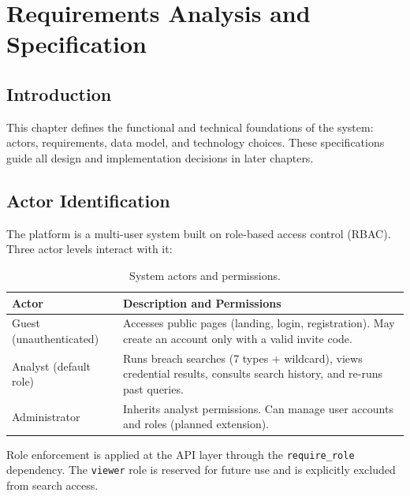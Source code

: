 \chapter{Requirements Analysis and Specification}
\label{chap:requirements}

\section*{Introduction}

This chapter defines the functional and technical foundations of the system:
actors, requirements, data model, and technology choices. These specifications
guide all design and implementation decisions in later chapters.

\section{Actor Identification}
\label{sec:actors}

The platform is a multi-user system built on role-based access control (RBAC).
Three actor levels interact with it:

\renewcommand{\arraystretch}{1.45}
\begin{table}[ht]
\centering
\caption{System actors and permissions.}
\label{tab:actors}
\begin{tabularx}{\textwidth}{@{} l X @{}}
\toprule
\textbf{Actor} & \textbf{Description and Permissions} \\
\midrule
Guest (unauthenticated) &
  Accesses public pages (landing, login, registration). May create an account
  only with a valid invite code. \\[8pt]
Analyst (default role) &
  Runs breach searches (7 types + wildcard), views credential results,
  consults search history, and re-runs past queries. \\[8pt]
Administrator &
  Inherits analyst permissions. Can manage user accounts and roles
  (planned extension). \\
\bottomrule
\end{tabularx}
\end{table}

Role enforcement is applied at the API layer through the \texttt{require\_role}
dependency. The \texttt{viewer} role is reserved for future use and is
explicitly excluded from search access.

